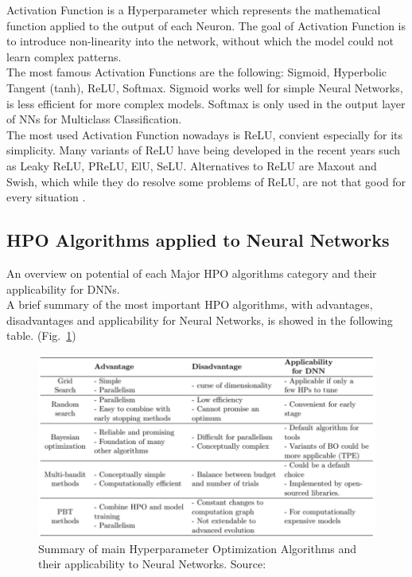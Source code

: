 Activation Function is a Hyperparameter which represents the mathematical function applied to the output of each Neuron.
The goal of Activation Function is to introduce non-linearity into the network, without which the model could not learn complex patterns.
\\[0.3cm]The most famous Activation Functions are the following: Sigmoid, Hyperbolic Tangent (tanh), ReLU, Softmax.
Sigmoid works well for simple Neural Networks, is less efficient for more complex models.
Softmax is only used in the output layer of NNs for Multiclass Classification.
\\[0.3cm]The most used Activation Function nowadays is ReLU, convient especially for its simplicity. Many variants of ReLU have being developed in the recent years such as Leaky ReLU, PReLU, ElU, SeLU.
Alternatives to ReLU are Maxout and Swish, which while they do resolve some problems of ReLU, are not that good for every situation \cite{Tesi-1.9}.

\subsection{HPO Algorithms applied to Neural Networks}

An overview on potential of each Major HPO algorithms category and their applicability for DNNs.
\\[0.3cm]A brief summary of the most important HPO algorithms, with advantages, disadvantages and applicability for Neural Networks, is showed in the following table. (Fig.~\ref{fig:figure-2.6.1})
\begin{figure}[t]
	\centering
	\includegraphics[width=15cm]{figures/figure-2.6.1.png}
	\caption[HPO Algorithm for NNs Summary]{Summary of main Hyperparameter Optimization Algorithms and their applicability to Neural Networks. Source:~\cite{Tesi-1.9}}
	\label{fig:figure-2.6.1}
\end{figure}

